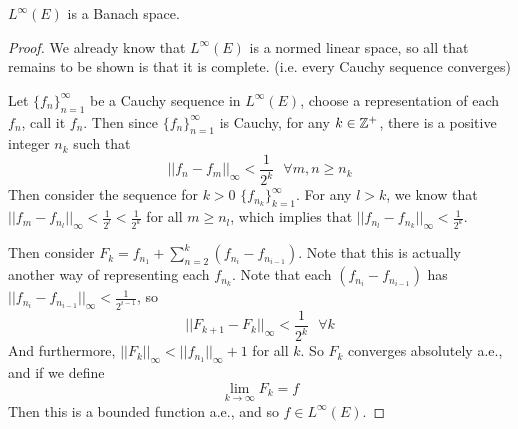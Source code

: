 \pagebreak
\begin{pblm} %
	$L^\infty(E)$ is a Banach space. 
\begin{proof}
	We already know that $L^\infty(E)$ is a normed linear space, so all that remains to be shown 
	is that it is complete. (i.e. every Cauchy sequence converges)

	Let $\{f_n\}_{n=1}^\infty$ be a Cauchy sequence in $L^\infty(E)$, choose a representation of each 
	$f_n$, call it $f_n$. Then since $\{f_n\}_{n=1}^\infty$ is Cauchy, for any $k \in \mathbb{Z}^+$, there is 
	a positive integer $n_k$ such that 
	\begin{equation*}
		||f_n - f_m||_\infty < \frac{1}{2^k}~~~\forall m, n \ge n_k
	\end{equation*}
	Then consider the sequence for $k > 0$ $\{f_{n_k}\}_{k=1}^\infty$. For any $l > k$, we know that 
	$||f_m - f_{n_l}||_\infty < \frac{1}{2^l} < \frac{1}{2^k}$ for all $m \ge n_l$, which implies that 
	$||f_{n_l} - f_{n_k}||_\infty < \frac{1}{2^k}$. 

	Then consider $F_k = f_{n_1} + \sum\limits_{n=2}^k (f_{n_i} - f_{n_{i-1}})$. Note that this is actually 
	another way of representing each $f_{n_k}$. Note that each $(f_{n_i} - f_{n_{i-1}})$ has 
	$||f_{n_i} - f_{n_{i-1}}||_\infty < \frac{1}{2^{i-1}}$, so 
	\begin{equation*}
		||F_{k+1} - F_k||_\infty < \frac{1}{2^k} ~~~\forall k
	\end{equation*}
	And furthermore, $||F_k||_\infty < ||f_{n_1}||_\infty + 1$ for all $k$. 
	So $F_k$ converges absolutely a.e., and if we define 
	\begin{equation*}
		\lim\limits_{k\to\infty}F_k = f
	\end{equation*}
	Then this is a bounded function a.e., and so $f \in L^\infty(E)$. 


\end{proof}
\end{pblm}
